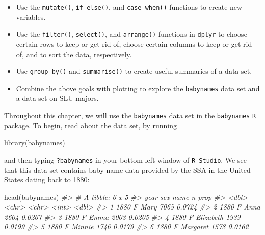 \documentclass[
]{book}
\newenvironment{Shaded}{\begin{snugshade}}{\end{snugshade}}
\newcommand{\CommentTok}[1]{\textcolor[rgb]{0.56,0.35,0.01}{\textit{#1}}}
\newcommand{\FunctionTok}[1]{\textcolor[rgb]{0.00,0.00,0.00}{#1}}
\newcommand{\NormalTok}[1]{#1}
\begin{document}
\begin{itemize}
\item
  Use the \texttt{mutate()}, \texttt{if\_else()}, and \texttt{case\_when()} functions to create new variables.
\item
  Use the \texttt{filter()}, \texttt{select()}, and \texttt{arrange()} functions in \texttt{dplyr} to choose certain rows to keep or get rid of, choose certain columns to keep or get rid of, and to sort the data, respectively.
\item
  Use \texttt{group\_by()} and \texttt{summarise()} to create useful summaries of a data set.
\item
  Combine the above goals with plotting to explore the \texttt{babynames} data set and a data set on SLU majors.
\end{itemize}

Throughout this chapter, we will use the \texttt{babynames} data set in the \texttt{babynames} \texttt{R} package. To begin, read about the data set, by running

\begin{Shaded}
\begin{Highlighting}[]
\FunctionTok{library}\NormalTok{(babynames)}
\end{Highlighting}
\end{Shaded}

and then typing \texttt{?babynames} in your bottom-left window of \texttt{R\ Studio}. We see that this data set contains baby name data provided by the SSA in the United States dating back to 1880:

\begin{Shaded}
\begin{Highlighting}[]
\FunctionTok{head}\NormalTok{(babynames)}
\CommentTok{\#\textgreater{} \# A tibble: 6 x 5}
\CommentTok{\#\textgreater{}    year sex   name          n   prop}
\CommentTok{\#\textgreater{}   \textless{}dbl\textgreater{} \textless{}chr\textgreater{} \textless{}chr\textgreater{}     \textless{}int\textgreater{}  \textless{}dbl\textgreater{}}
\CommentTok{\#\textgreater{} 1  1880 F     Mary       7065 0.0724}
\CommentTok{\#\textgreater{} 2  1880 F     Anna       2604 0.0267}
\CommentTok{\#\textgreater{} 3  1880 F     Emma       2003 0.0205}
\CommentTok{\#\textgreater{} 4  1880 F     Elizabeth  1939 0.0199}
\CommentTok{\#\textgreater{} 5  1880 F     Minnie     1746 0.0179}
\CommentTok{\#\textgreater{} 6  1880 F     Margaret   1578 0.0162}
\end{Highlighting}
\end{Shaded}
\end{document}
